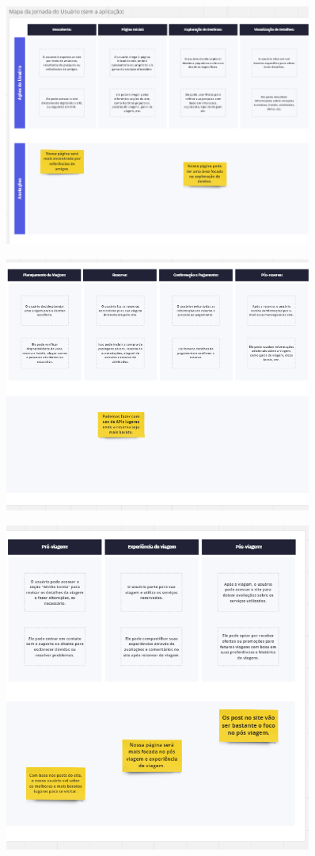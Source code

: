 \documentclass{article}
\begin{document}
\begin{figure}[h]
      \centering
      \includegraphics [width=0.9\textwidth]{IMGDOC/MapaSemA1.png}
      \label{fig:imagem}
\end{figure}
\begin{figure}[h]
      \centering
      \includegraphics [width=0.9\textwidth]{IMGDOC/MapaSemA2.png}
      \label{fig:imagem}
\end{figure}\begin{figure}[h]
      \centering
      \includegraphics [width=0.9\textwidth]{IMGDOC/MapaSemA3.png}
      \label{fig:imagem}
\end{figure}
\end{document}
